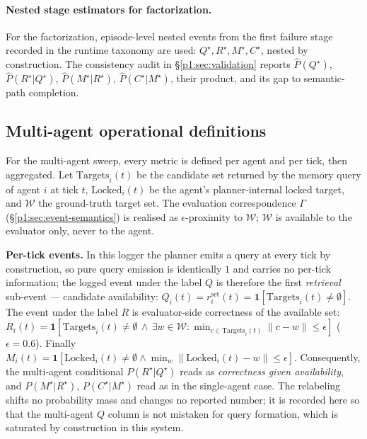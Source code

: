 \documentclass{article}
\begin{document}
\paragraph{Nested stage estimators for factorization.}
For the factorization, episode-level nested events from the first failure stage recorded in the runtime taxonomy are used: $Q^\star, R^\star, M^\star, C^\star$, nested by construction. The consistency audit in \S\ref{p1:sec:validation} reports $\hat P(Q^\star)$, $\hat P(R^\star|Q^\star)$, $\hat P(M^\star|R^\star)$, $\hat P(C^\star|M^\star)$, their product, and its gap to semantic-path completion.

\subsection{Multi-agent operational definitions}
\label{p1:app:multi-agent-defs}

For the multi-agent sweep, every metric is defined per agent and per tick, then aggregated. Let $\mathrm{Targets}_i(t)$ be the candidate set returned by the memory query of agent $i$ at tick $t$, $\mathrm{Locked}_i(t)$ be the agent's planner-internal locked target, and $\mathcal{W}$ the ground-truth target set. The evaluation correspondence $\Gamma$ (\S\ref{p1:sec:event-semantics}) is realised as $\epsilon$-proximity to $\mathcal{W}$; $\mathcal{W}$ is available to the evaluator only, never to the agent.

\textbf{Per-tick events.} In this logger the planner emits a query at every tick by construction, so pure query emission is identically $1$ and carries no per-tick information; the logged event under the label $Q$ is therefore the first \emph{retrieval} sub-event --- candidate availability: $Q_i(t) = r^{\mathrm{set}}_i(t) = \mathbf{1}[\mathrm{Targets}_i(t) \ne \emptyset]$. The event under the label $R$ is evaluator-side correctness of the available set: $R_i(t) = \mathbf{1}[\mathrm{Targets}_i(t) \ne \emptyset \,\land\, \exists w \in \mathcal{W}: \min_{c \in \mathrm{Targets}_i(t)}\|c - w\| \le \epsilon]$ ($\epsilon = 0.6$). Finally $M_i(t) = \mathbf{1}[\mathrm{Locked}_i(t) \ne \emptyset \land \min_w\|\mathrm{Locked}_i(t) - w\| \le \epsilon]$. Consequently, the multi-agent conditional $P(R^\star|Q^\star)$ reads as \emph{correctness given availability}, and $P(M^\star|R^\star)$, $P(C^\star|M^\star)$ read as in the single-agent case. The relabeling shifts no probability mass and changes no reported number; it is recorded here so that the multi-agent $Q$ column is not mistaken for query formation, which is saturated by construction in this system.
\end{document}
